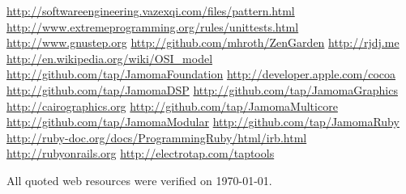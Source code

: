 \documentclass[twoside,10pt]{article}
\begin{document}






\renewcommand{\refname}{Web Resources}
\begin{thebibliography}{99}
	\footnotesize
{}    \url{http://softwareengineering.vazexqi.com/files/pattern.html}
    \url{http://www.extremeprogramming.org/rules/unittests.html}
    \url{http://www.gnustep.org} 
    \url{http://github.com/mhroth/ZenGarden}  
    \url{http://rjdj.me} 
    \url{http://en.wikipedia.org/wiki/OSI_model}
    \url{http://github.com/tap/JamomaFoundation}     
    \url{http://developer.apple.com/cocoa}    
 	  \url{http://github.com/tap/JamomaDSP}
  \url{http://github.com/tap/JamomaGraphics} 
  \url{http://cairographics.org}
  \url{http://github.com/tap/JamomaMulticore}
  \url{http://github.com/tap/JamomaModular}
  \url{http://github.com/tap/JamomaRuby}
  \url{http://ruby-doc.org/docs/ProgrammingRuby/html/irb.html}
  \url{http://rubyonrails.org}   
	\url{http://electrotap.com/taptools}
\end{thebibliography} 
All quoted web resources were verified on \today.
\end{document}
